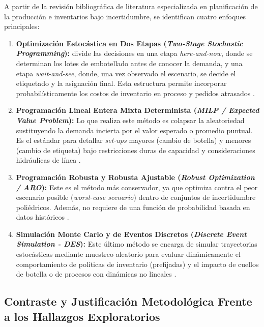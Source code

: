 A partir de la revisión bibliográfica de literatura especializada en planificación de la producción e inventarios bajo incertidumbre, se identifican cuatro enfoques principales:
\begin{enumerate}
    \item \textbf{Optimización Estocástica en Dos Etapas (\textit{Two-Stage Stochastic Programming}):} divide las decisiones en una etapa \textit{here-and-now}, donde se determinan los lotes de embotellado antes de conocer la demanda, y una etapa \textit{wait-and-see}, donde, una vez observado el escenario, se decide el etiquetado y la asignación final. Esta estructura permite incorporar probabilísticamente los costos de inventario en proceso y pedidos atrasados
\cite{boussouf2026two,cunha2017stochastic,gupta2000two}.

    \item \textbf{Programación Lineal Entera Mixta Determinista (\textit{MILP / Expected Value Problem}):} Lo que realiza este método es colapsar la aleatoriedad sustituyendo la demanda incierta por el valor esperado o promedio puntual. Es el estándar para detallar \textit{set-ups} mayores (cambio de botella) y menores (cambio de etiqueta) bajo restricciones duras de capacidad y consideraciones hidráulicas de línea \cite{gunther2014block, lillo2025optimal, mac2022scheduling}.

    \item \textbf{Programación Robusta y Robusta Ajustable (\textit{Robust Optimization / ARO}):} Este es el método más conservador, ya que optimiza contra el peor escenario posible (\textit{worst-case scenario}) dentro de conjuntos de incertidumbre poliédricos. Además, no requiere de una función de probabilidad basada en datos históricos \cite{hu2020hybrid, lappas2016multi}.

    \item \textbf{Simulación Monte Carlo y de Eventos Discretos (\textit{Discrete Event Simulation - DES}):} Este último método se encarga de simular trayectorias estocásticas mediante muestreo aleatorio para evaluar dinámicamente el comportamiento de políticas de inventario (prefijadas) y el impacto de cuellos de botella o de procesos con dinámicas no lineales \cite{jeon2016survey, review2024simula}.
\end{enumerate}

\subsection{Contraste y Justificación Metodológica Frente a los Hallazgos Exploratorios}

